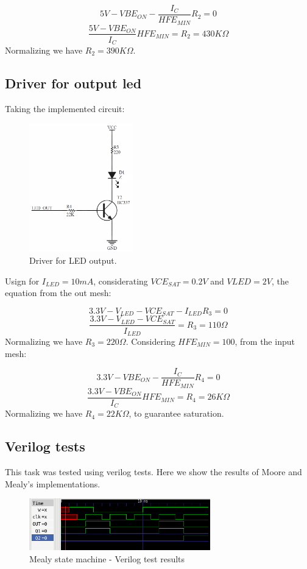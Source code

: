 $$5V - VBE_{ON} - \frac{I_C}{HFE_{MIN}}R_2 = 0$$
$$\frac{5V - VBE_{ON}}{I_C}HFE_{MIN} = R_2 = 430K\Omega$$
Normalizing we have $R_2 = 390K\Omega$.

\subsection*{Driver for output led}
Taking the implemented circuit:

\begin{figure}[H]
    \begin{centering}
    \includegraphics[width=0.4\textwidth]{data/Graficos3/LED_Driver.png}
    \par\end{centering}
    \caption{Driver for LED output.}
\end{figure}

Usign for $I_{LED} = 10mA$, considerating $VCE_{SAT} = 0.2V$ 
and $V{LED} = 2V$, the equation from the out mesh:

$$3.3V - V_{LED} - VCE_{SAT} - I_{LED}R_3 = 0$$
$$\frac{3.3V - V_{LED} - VCE_{SAT}}{I_{LED}} = R_3 = 110\Omega$$
Normalizing we have $R_3 = 220\Omega$.
Considering $HFE_{MIN} = 100$, from the input mesh:

$$3.3V - VBE_{ON} - \frac{I_C}{HFE_{MIN}}R_4 = 0$$
$$\frac{3.3V - VBE_{ON}}{I_C}HFE_{MIN} = R_4 = 26K\Omega$$
Normalizing we have $R_4 = 22K\Omega$, to guarantee saturation.


\subsection *{Verilog tests}
This task was tested using verilog tests. Here we show the results of Moore and Mealy's implementations.

\begin{figure}[H]
    \begin{centering}
    \includegraphics[width=0.7\textwidth]{data/Graficos3/3a.png}
    \par\end{centering}
    \caption{Mealy state machine - Verilog test results}
\end{figure}

